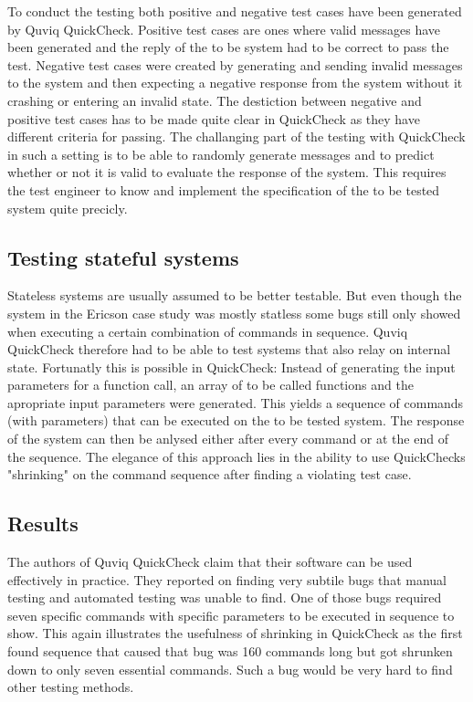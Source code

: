 \documentclass[a4paper, 12pt]{article} %
\begin{document}
To conduct the testing both positive and negative test cases have been generated by Quviq QuickCheck. Positive test cases are ones where valid messages have been generated and the reply of the to be system had to be correct to pass the test. Negative test cases were created by generating and sending invalid messages to the system and then expecting a negative response from the system without it crashing or entering an invalid state. The destiction between negative and positive test cases has to be made quite clear in QuickCheck as they have different criteria for passing. The challanging part of the testing with QuickCheck in such a setting is to be able to randomly generate messages and to predict whether or not it is valid to evaluate the response of the system. This requires the test engineer to know and implement the specification of the to be tested system quite precicly. \cite{Arts06}

\subsection{Testing stateful systems}

Stateless systems are usually assumed to be better testable. But even though the system in the Ericson case study was mostly statless some bugs still only showed when executing a certain combination of commands in sequence. Quviq QuickCheck therefore had to be able to test systems that also relay on internal state. Fortunatly this is possible in QuickCheck: Instead of generating the input parameters for a function call, an array of to be called functions and the apropriate input parameters were generated. This yields a sequence of commands (with parameters) that can be executed on the to be tested system. The response of the system can then be anlysed either after every command or at the end of the sequence. The elegance of this approach lies in the ability to use QuickChecks "shrinking" on the command sequence after finding a violating test case. \cite{Arts06} 

\subsection{Results}

The authors of Quviq QuickCheck claim that their software can be used effectively in practice. They reported on finding very subtile bugs that manual testing and automated testing was unable to find. One of those bugs required seven specific commands with specific parameters to be executed in sequence to show. This again illustrates the usefulness of shrinking in QuickCheck as the first found sequence that caused that bug was 160 commands long but got shrunken down to only seven essential commands. Such a bug would be very hard to find other testing methods. \cite{Arts06}
\end{document}
